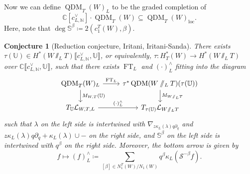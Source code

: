 \documentclass{amsart}
\newtheorem{conj}[thm]{Conjecture}
\theoremstyle{definition}
\theoremstyle{remark}
\theoremstyle{plain}
\theoremstyle{definition}
\theoremstyle{remark}
\newcommand{\N}{\mathbb{N}}
\newcommand{\C}{\mathbb{C}}
\newcommand{\bS}{\mathbb{S}}
\renewcommand{\mc}[1]{\mathcal{#1}}
\newcommand{\mr}[1]{\mathrm{#1}}
\newcommand{\1}{\mathbf{1}}
\newcommand{\2}{\mathbf{2}}
\newcommand{\3}{\mathbf{3}}
\newcommand{\ps}[1]{\lBrack #1 \rBrack}
\DeclareMathOperator{\QDM}{QDM}
\DeclareMathOperator{\FT}{FT}
\begin{document}
Now we can define \(\QDM_T(W)_L\) to be the graded completion of 
\[ \C[c_{L,\N}^{\vee}] \cdot \QDM_T(W) \subseteq \QDM_T(W)_{\mr{loc}}. \]
Here, note that \(\deg \bS^{\beta} \coloneqq 2 (c_1^T(W), \beta)\).

\begin{conj}[Reduction conjecture, Iritani, Iritani-Sanda]
    There exists \(\tau(\mathbb{U}) \in H^*(W \sslash_L T)\ps{c_{L, \N}^{\vee}, \mathbb{U}}\), or equivalently, \(\tau \colon H_T^*(W) \to H^*(W \sslash_L T)\) over \(\C\ps{c_{L,\N}^{\vee}, \mathbb{U}}\), such that there exists \(\FT_L\) and \((\cdot)_L^{\wedge}\) fitting into the diagram
    \begin{equation*}
    \begin{tikzcd}
        \QDM_T(W)_L \ar{r}{\FT_L} \ar{d}{M_{W,T}(\mathbb{U})} & \tau^* \QDM(W \sslash_L T) \ar{d}{M_{W \sslash_L T}}(\tau(\mathbb{U})) \\
        T_{\mathbb{U}} \mc{L}_{W,T,L} \ar{r}{(\cdot)_L^{\wedge}} & T_{\tau(\mathbb{U})} \mc{L}_{W \sslash_L T}
    \end{tikzcd}
    \end{equation*}
    such that \(\lambda\) on the left side is intertwined with \(\nabla_{z \kappa_L(\lambda) q \partial_q}\) and \(z \kappa_L(\lambda) q \partial_q + \kappa_L (\lambda) \cup -\) on the right side, and \(\bS^{\beta}\) on the left side is intertwined with \(q^{\beta}\) on the right side. Moreover, the bottom arrow is given by
    \[ f \mapsto (f)_L^{\wedge} \coloneqq \sum_{[\beta] \in N_1^T(W) / N_1(W)} q^{\beta} \kappa_L(\mc{S}^{-\beta} f). \]
\end{conj}
\end{document}
